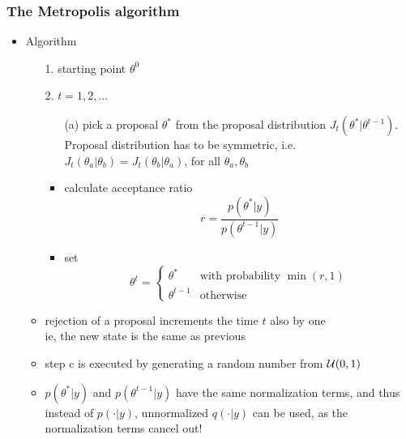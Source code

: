 \documentclass[10pt]{beamer}
\begin{document}
\begin{frame}

\frametitle{The Metropolis algorithm}

  \begin{itemize}
  \item Algorithm
    \begin{itemize}
      \item[1.] starting point $\theta^0$
      \item[2.] $t=1,2,\ldots$
        \begin{itemize}
        \item[(a)] pick a proposal $\theta^{*}$ from the proposal distribution
          $J_t(\theta^{*}|\theta^{t-1})$. \\
          Proposal distribution has to be symmetric, i.e.\\
          $J_t(\theta_a|\theta_b)=J_t(\theta_b|\theta_a)$, for all
          $\theta_a,\theta_b$
        \item<2->[(b)] calculate acceptance ratio
          \begin{equation*}
            r=\frac{p(\theta^{*}|y)}{p(\theta^{t-1}|y)}
          \end{equation*}
          \vspace{-6mm}
        \item<3->[(c)] set
          \begin{equation*}
            \theta^t=
            \begin{cases}
              \theta^{*} & \text{with probability $\min(r,1)$}\\
              \theta^{t-1} & \text{otherwise}
            \end{cases}
          \end{equation*}
      \end{itemize}
      \vspace{-1.5\baselineskip}
    \item<5-> rejection of a proposal increments the time $t$ also by one\\
      ie, the new state is the same as previous
      \item<6-> step c is executed by generating a random number from
        $\mathcal{U}(0,1)$
      \item<7-> $p(\theta^*|y)$ and $p(\theta^{t-1}|y)$ have the same
        normalization terms, and thus instead of $p(\cdot|y)$,
        unnormalized $q(\cdot|y)$ can be used, as the normalization
        terms cancel out!
    \end{itemize}
  \end{itemize}

\end{frame}
\end{document}
